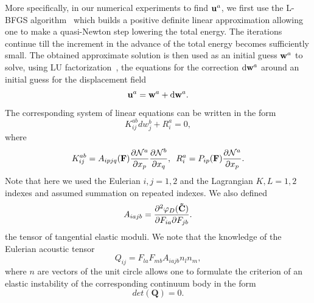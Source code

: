 \documentclass[aps,
superscriptaddress,notitlepage]{revtex4-1}
\def\phi{\varphi}
\begin{document}
 More specifically, in our numerical experiments to find ${\bf u}^a$, we first use the L-BFGS algorithm~\cite{Bochkanov2013-lk} which builds a positive definite linear approximation allowing one to make a quasi-Newton step lowering the total energy.   The   iterations continue till  the increment  in the advance of the total energy   becomes sufficiently small. The obtained approximate solution is then   used as an initial guess  ${\bf w}^a$ to solve, using LU factorization~\cite{Sanderson2016-ht,itensor},  the  equations for the correction  $\text{d}{\bf w}^a$
 around   an initial guess for the displacement field $${\bf u}^a={\bf w}^a +  \text{d}{\bf w}^a.$$  The corresponding  system of linear equations can be written in the form
   \begin{equation}
 K^{ab}_{ij}dw_j^b+R_i^a =0,
 \end{equation}
  where 
\begin{equation}
K^{ab}_{ij}= A_{ipjq}({\bf F}) \frac{\partial {\mathcal N}^a}{\partial x_p}\frac{\partial {\mathcal N}^b}{\partial x_q},\,\,\, R^a_i= P_{ip}( {\bf F}) \frac{\partial {\mathcal N}^a}{\partial x_p}.
\end{equation}
Note that here  we used the Eulerian $i,j=1,2$ and the Lagrangian $K,L =1,2$ indexes and assumed summation on repeated indexes.  
We also defined  
 \begin{equation}
 A_{iajb}= \frac{\partial^2\phi_D{({\bf \tilde C} )}}{\partial F_{ia}\partial F_{jb}}.
\end{equation}
 the tensor of tangential elastic moduli. We note that  the knowledge of the Eulerian acoustic tensor  
 \begin{equation}\label{Q}
 {Q}_{ij}=F_{la} F_{mb} A_{iajb} n_l n_m,
 \end{equation}
  where $n$ are vectors of the unit circle allows one to  formulate the criterion of an elastic instability of the corresponding continuum body  in the form \cite{Ogden1997-rf,Grabovsky2014-fb}
  \begin{equation} \label{detQ}
  det (\boldsymbol{{Q}})=0.
  \end{equation}  
\end{document}
